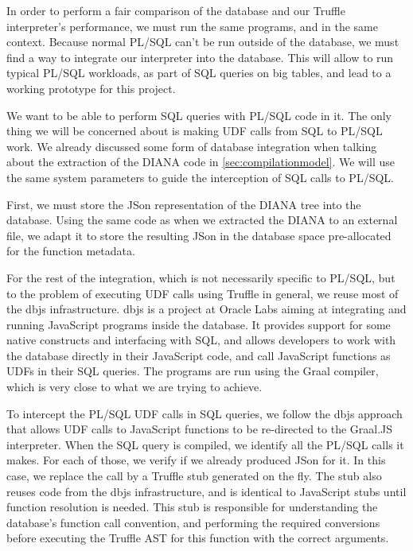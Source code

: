 \documentclass[twoside,11pt,a4paper]{article}
\begin{document}

In order to perform a fair comparison of the database and our Truffle interpreter's performance, we must run the same programs, and in the same context. Because normal PL/SQL can't be run outside of the database, we must find a way to integrate our interpreter into the database. This will allow to run typical PL/SQL workloads, as part of SQL queries on big tables, and lead to a working prototype for this project.

We want to be able to perform SQL queries with PL/SQL code in it. The only thing we will be concerned about is making UDF calls from SQL to PL/SQL work. We already discussed some form of database integration when talking about the extraction of the DIANA code in \ref{sec:compilationmodel}. We will use the same system parameters to guide the interception of SQL calls to PL/SQL.

First, we must store the JSon representation of the DIANA tree into the database. Using the same code as when we extracted the DIANA to an external file, we adapt it to store the resulting JSon in the database space pre-allocated for the function metadata.

For the rest of the integration, which is not necessarily specific to PL/SQL, but to the problem of executing UDF calls using Truffle in general, we reuse most of the dbjs infrastructure. dbjs is a project at Oracle Labs aiming at integrating and running JavaScript programs inside the database. It provides support for some native constructs and interfacing with SQL, and allows developers to work with the database directly in their JavaScript code, and call JavaScript functions as UDFs in their SQL queries. The programs are run using the Graal compiler, which is very close to what we are trying to achieve.

To intercept the PL/SQL UDF calls in SQL queries, we follow the dbjs approach that allows UDF calls to JavaScript functions to be re-directed to the Graal.JS interpreter. When the SQL query is compiled, we identify all the PL/SQL calls it makes. For each of those, we verify if we already produced JSon for it. In this case, we replace the call by a Truffle stub generated on the fly. The stub also reuses code from the dbjs infrastructure, and is identical to JavaScript stubs until function resolution is needed. This stub is responsible for understanding the database's function call convention, and performing the required conversions before executing the Truffle AST for this function with the correct arguments.
\end{document}
